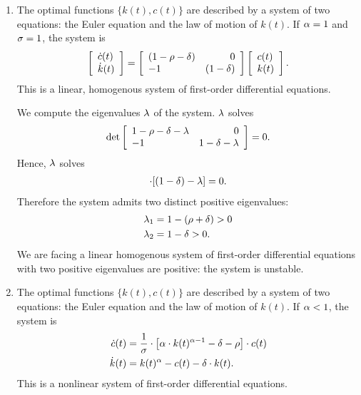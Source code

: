 \documentclass[letterpaper,12pt,leqno]{article}
\begin{document}
\begin{enumerate}
\item The optimal functions $\{k(t),c(t)\}$ are described by a system of two equations: the Euler equation and the law of motion of $k(t)$. If $\alpha=1$ and $\sigma =1$, the system is
\begin{align*}
\left[
\begin{array}{l}
\dot{c}(t) \\ 
\dot{k}(t)
\end{array}
\right] =\left[
\begin{array}{lr}
(1-\rho-\delta)& 0\\
-1 &(1-\delta)
\end{array}
\right]\left[
\begin{array}{l}
c(t) \\ 
k(t)
\end{array}\right].
\end{align*}
This is a linear, homogenous system of first-order differential equations.

We compute the eigenvalues $\lambda$ of the system. $\lambda$ solves
\begin{align*}
\det\left[
\begin{array}{lr}
1-\rho-\delta-\lambda& 0\\
-1 &1-\delta-\lambda
\end{array}\right]=0.
\end{align*}
Hence, $\lambda$ solves
\begin{align*}
[(1-\rho-\d)-\l]\cdot [(1-\d)-\l]=0.
\end{align*}
Therefore the system admits two distinct positive eigenvalues:
\begin{align*}
\lambda_{1}&=1-(\rho+\delta)>0\\
\lambda_{2}&=1-\delta>0.
\end{align*}
We are facing a linear homogenous system of first-order differential equations with two positive eigenvalues are positive:  the system is unstable.


\item The optimal functions $\{k(t),c(t)\}$ are described by a system of two equations: the Euler equation and the law of motion of $k(t)$. If $\alpha<1$, the system is
\begin{align*}
\dot{c}(t)&=\frac{1}{\sigma}\cdot \left[\alpha\cdot k(t)^{\alpha-1}-\delta -\rho\right]\cdot c(t)\\
\dot{k}(t) &=k(t)^{\alpha}-c(t)-\delta \cdot k(t).
\end{align*}
This is a nonlinear system of first-order differential equations.


\end{enumerate}
\end{document}
